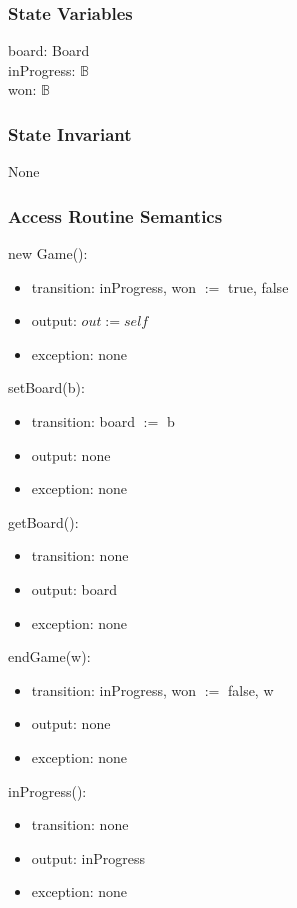 \documentclass[12pt]{article}
\begin{document}
\subsubsection* {State Variables}

board: Board\\
inProgress: $\mathbb{B}$\\
won: $\mathbb{B}$\\

\subsubsection* {State Invariant}

None

\subsubsection* {Access Routine Semantics}

\noindent new Game():
\begin{itemize}
\item transition: inProgress, won $:=$ true, false
\item output: $out := self$
\item exception: none
\end{itemize}

\noindent setBoard(b):
\begin{itemize}
\item transition: board $:=$ b
\item output: none
\item exception: none
\end{itemize}

\noindent getBoard():
\begin{itemize}
\item transition: none
\item output: board
\item exception: none
\end{itemize}

\noindent endGame(w):
\begin{itemize}
\item transition: inProgress, won $:=$ false, w
\item output: none
\item exception: none
\end{itemize}

\noindent inProgress():
\begin{itemize}
\item transition: none
\item output: inProgress
\item exception: none
\end{itemize}
\end{document}
